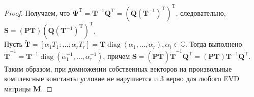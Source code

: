 \documentclass[specialist, substylefile = spbureport.rtx, subf,href,colorlinks=true, 12pt]{disser}
\theoremstyle{definition}
\DeclareMathOperator{\diag}{diag}
\begin{document}
\begin{proof}
Получаем, что $\mathbf{\Psi}^{\mathrm{T}} = \mathbf{T}^{-1}\mathbf{Q}^{\mathrm{T}} = (\mathbf{Q}(\mathbf{T}^{-1})^{\mathrm{T}})^{\mathrm{T}}$, следовательно, $\mathbf{S} = (\mathbf{PT})(\mathbf{Q}(\mathbf{T}^{-1})^{\mathrm{T}})^{\mathrm{T}}$. \\
\hspace*{0.5cm} Пусть $\widetilde{\mathbf{T}} = [\alpha_1T_1: \dots :\alpha_rT_r] = \mathbf{T}\diag (\alpha_1, \dots ,\alpha_r), \alpha_i \in \mathbb{C}$. Тогда выполнено $\widetilde{\mathbf{T}}^{-1} = \mathbf{T}^{-1}\diag (\alpha_1^{-1}, \dots ,\alpha_r^{-1})$, причем $\mathbf{S} = (\mathbf{P}\widetilde{\mathbf{T}})\widetilde{\mathbf{T}}^{-1}\mathbf{Q}^{\mathrm{T}} = (\mathbf{P}\mathbf{T})\mathbf{T}^{-1}\mathbf{Q}^{\mathrm{T}}$. Таким образом, при домножении собственных векторов
на произвольные комплексные константы условие не нарушается и 3
верно для любого EVD матрицы $\mathbf{M}$.
\end{proof}
\end{document}
